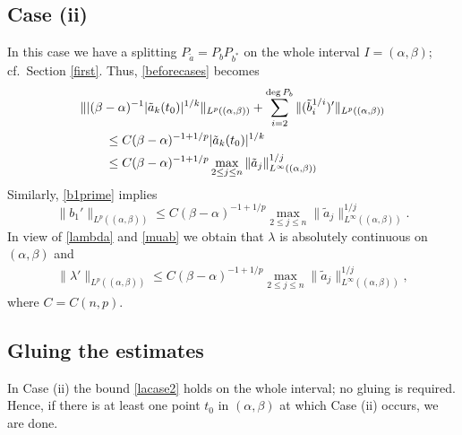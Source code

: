\documentclass[12pt]{amsart}
\theoremstyle{plain}
\theoremstyle{definition}
\numberwithin{equation}{section}
\begin{document}
\subsection*{Case (ii)}  In this case we have a splitting  $P_{\tilde a} = P_b P_{b^*}$ on the whole interval $I=({\alpha},{\beta})$; cf.\ 
Section \ref{first}. Thus, \eqref{beforecases} becomes 
\begin{align*}
  \MoveEqLeft
  \||({\beta}-{\alpha})^{-1} |\tilde a_k (t_0)|^{1/k} \|_{L^p (({\alpha},{\beta}))} + \sum_{i=2}^{\deg P_b} \|(\tilde b_i^{1/i})'\|_{L^p(({\alpha},{\beta}))} 
  \\
  &\le C  ({\beta}-{\alpha})^{-1+1/p} |\tilde a_k (t_0)|^{1/k}
  \\
  &\le C  ({\beta}-{\alpha})^{-1+1/p} \max_{2 \le j \le n} \|\tilde a_j\|^{1/j}_{L^\infty(({\alpha},{\beta}))}
\end{align*}
Similarly, \eqref{b1prime} implies 
\begin{equation*}
  \|b_1'\|_{L^p(({\alpha},{\beta}))} \le C ({\beta}-{\alpha})^{-1+1/p} \max_{2 \le j \le n} \|\tilde a_j\|^{1/j}_{L^\infty(({\alpha},{\beta}))}.
\end{equation*}
In view of \eqref{lambda} and \eqref{muab} we obtain that ${\lambda}$ is absolutely continuous on $({\alpha},{\beta})$ and 
\begin{align} \label{lacase2}
  \|{\lambda}'\|_{L^p(({\alpha},{\beta}))} \le C ({\beta}-{\alpha})^{-1+1/p} \max_{2 \le j \le n} \|\tilde a_j\|^{1/j}_{L^\infty(({\alpha},{\beta}))},
\end{align}
where $C = C(n,p)$.

\subsection*{Gluing the estimates}
In Case (ii) the bound \eqref{lacase2} holds on the whole interval; no gluing is required. 
Hence, if there is at least one point $t_0$ in $({\alpha},{\beta})$ at which Case (ii) occurs, we are done. 
\end{document}
